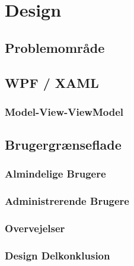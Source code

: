 \chapter{Design}

\section{Problemområde}

\section{WPF / XAML}
\subsection{Model-View-ViewModel}

\section{Brugergrænseflade}
\subsection{Almindelige Brugere}
\subsection{Administrerende Brugere}
\subsection{Overvejelser}
\subsection{Design Delkonklusion}



